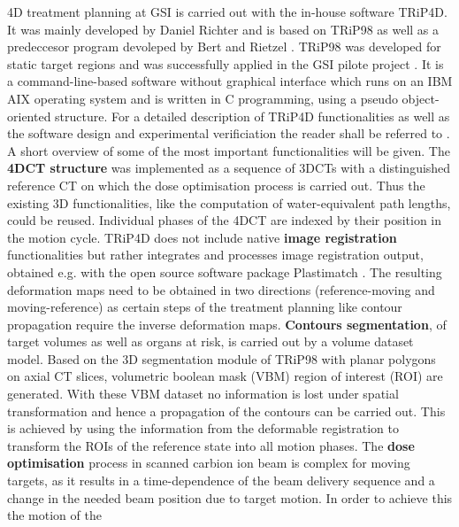 \documentclass[type=dr, dr=rernat, accentcolor=tud7b,colorbacktitle, bigchapter, openright, twoside, 12pt ]{tudthesis}
\begin{document}
4D treatment planning at GSI is carried out with the in-house software TRiP4D. It was mainly developed by Daniel Richter \cite{Ric12} and 
is based on TRiP98 as well as a predeccesor program devoleped by Bert and Rietzel \cite{Ber07b}.  
TRiP98 was developed for static target regions and was successfully applied in the GSI pilote project \cite{Krae10} \cite{Krae00} \cite{Krae00b}.  
It is a command-line-based software without graphical interface which runs on an IBM AIX operating system and is written in C 
programming, using a pseudo object-oriented structure. For a detailed description of TRiP4D functionalities as well as the software 
design and experimental verificiation the reader shall be referred to \cite{Ric12}. A short overview of some of the most important 
functionalities will be given.\newline
\newline
The \textbf{4DCT structure} was implemented as a sequence of 3DCTs with a distinguished reference CT on which the dose optimisation 
process is carried out. Thus the existing 3D functionalities, like the computation of water-equivalent path lengths, could be reused. 
Individual phases of the 4DCT are indexed by their position in the motion cycle. 
TRiP4D does not include native \textbf{image registration} functionalities but rather integrates and processes image registration output, obtained e.g. 
with the open source software package Plastimatch \cite{Sha07}. The resulting deformation maps need to be obtained in two directions 
(reference-moving and moving-reference) as certain steps of the treatment planning like contour propagation require the inverse deformation 
maps.
\textbf{Contours segmentation}, of target volumes as well as organs at risk, is carried out by a volume dataset model. Based on 
the 3D segmentation module of TRiP98 with planar polygons on axial CT slices, volumetric boolean mask (VBM) region of interest (ROI) are 
generated. 
With these VBM dataset no information is lost under spatial transformation and hence a propagation of the contours can be carried out. 
This is achieved by using the information from the deformable registration to transform the ROIs of the reference state into all motion 
phases.
The \textbf{dose optimisation} process in scanned carbion ion beam is complex for moving targets, as it results in a time-dependence 
of the beam delivery sequence and a change in the needed beam position due to target motion. In order to achieve this the motion of the 
\end{document}
